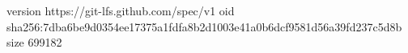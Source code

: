 version https://git-lfs.github.com/spec/v1
oid sha256:7dba6be9d0354ee17375a1fdfa8b2d1003e41a0b6dcf9581d56a39fd237c5d8b
size 699182
